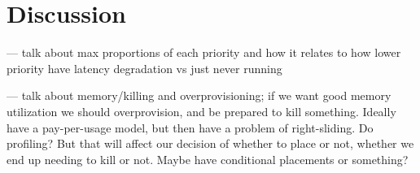 \section{Discussion}



--- talk about max proportions of each priority and how it relates to how lower
priority have latency degradation vs just never running


--- talk about memory/killing and overprovisioning; if we want good memory
utilization we should overprovision, and be prepared to kill something. Ideally
have a pay-per-usage model, but then have a problem of right-sliding. Do
profiling? But that will affect our decision of whether to place or not, whether
we end up needing to kill or not. Maybe have conditional placements or
something?